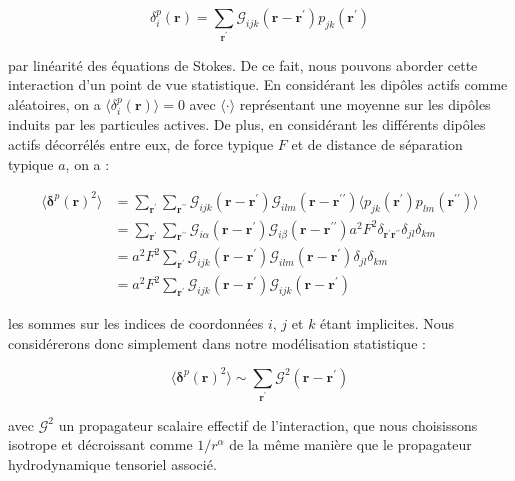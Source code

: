 \begin{equation}
	\delta^p_i(\mathbf{r}) = \sum_{\mathbf{r}^\prime}\mathcal{G}_{ijk}(\mathbf{r}-\mathbf{r}^\prime)p_{jk}(\mathbf{r}^\prime)
\end{equation}

\noindent par linéarité des équations de Stokes. De ce fait, nous pouvons aborder cette interaction d'un point de vue statistique. En considérant les dipôles actifs comme aléatoires, on a $\langle \delta^p_i(\mathbf{r}) \rangle = 0$ avec $\langle \cdot \rangle$ représentant une moyenne sur les dipôles induits par les particules actives. De plus, en considérant les différents dipôles actifs décorrélés entre eux, de force typique $F$ et de distance de séparation typique $a$, on a :

\begin{equation}
\begin{aligned}
	\langle\boldsymbol\delta^p(\mathbf{r})^2\rangle &= \sum_{\mathbf{r}^\prime}\sum_{\mathbf{r}^{\prime\prime}}\mathcal{G}_{ijk}(\mathbf{r}-\mathbf{r}^\prime)\mathcal{G}_{ilm}(\mathbf{r}-\mathbf{r}^{\prime\prime})\langle p_{jk}(\mathbf{r}^\prime)p_{lm}(\mathbf{r}^{\prime\prime})\rangle \\
	&= \sum_{\mathbf{r}^\prime}\sum_{\mathbf{r}^{\prime\prime}}\mathcal{G}_{i\alpha}(\mathbf{r}-\mathbf{r}^\prime)\mathcal{G}_{i\beta}(\mathbf{r}-\mathbf{r}^{\prime\prime})a^2F^2\delta_{\mathbf{r}^\prime\mathbf{r}^{\prime\prime}}\delta_{jl}\delta_{km}\\
	&= a^2 F^2\sum_{\mathbf{r}^\prime}\mathcal{G}_{ijk}(\mathbf{r}-\mathbf{r}^\prime)\mathcal{G}_{ilm}(\mathbf{r}-\mathbf{r}^{\prime})\delta_{jl}\delta_{km}\\
	&= a^2 F^2 \sum_{\mathbf{r}^\prime}\mathcal{G}_{ijk}(\mathbf{r}-\mathbf{r}^\prime)\mathcal{G}_{ijk}(\mathbf{r}-\mathbf{r}^{\prime})
\end{aligned}
\end{equation}

\noindent les sommes sur les indices de coordonnées $i$, $j$ et $k$ étant implicites. Nous considérerons donc simplement dans notre modélisation statistique :

\begin{equation}
	\langle \boldsymbol\delta^p(\mathbf{r})^2 \rangle \sim \sum_{\mathbf{r}^\prime} \mathcal{G}^2(\mathbf{r}-\mathbf{r}^\prime)
	\label{eq:convol_model}
\end{equation}

\noindent avec $\mathcal{G}^2$ un propagateur scalaire effectif de l'interaction, que nous choisissons isotrope et décroissant comme $1/r^{\alpha}$ de la même manière que le propagateur hydrodynamique tensoriel associé.


